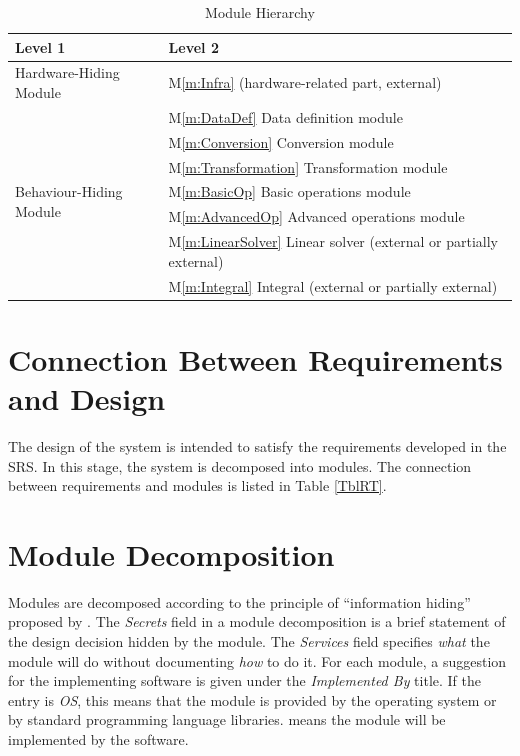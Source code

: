 \documentclass[12pt, titlepage]{article}
\newcommand{\mref}[1]{M\ref{m:#1}}
\begin{document}

\begin{table}[h!]
\centering
\begin{tabular}{p{} p{}}
\toprule
\textbf{Level 1} & \textbf{Level 2}\\
\midrule

{Hardware-Hiding Module} & \mref{Infra} (hardware-related part, external)\\
\midrule

\multirow{7}{0.3\textwidth}{Behaviour-Hiding Module} 
& \mref{DataDef} Data definition module\\
& \mref{Conversion} Conversion module\\
& \mref{Transformation} Transformation module\\
& \mref{BasicOp} Basic operations module\\
& \mref{AdvancedOp} Advanced operations module\\
\midrule

\multirow{3}{0.3\textwidth}{Software Decision Module} 
& \mref{LinearSolver} Linear solver (external or partially external)\\
& \mref{Integral} Integral (external or partially external)\\
\bottomrule

\end{tabular}
\caption{Module Hierarchy}
\label{TblMH}
\end{table}

\section{Connection Between Requirements and Design} \label{SecConnection}

The design of the system is intended to satisfy the requirements developed in
the SRS. In this stage, the system is decomposed into modules. The connection
between requirements and modules is listed in Table \ref{TblRT}.

\section{Module Decomposition} \label{SecMD}

Modules are decomposed according to the principle of ``information hiding''
proposed by \citet{ParnasEtAl1984}. The \emph{Secrets} field in a module
decomposition is a brief statement of the design decision hidden by the
module. The \emph{Services} field specifies \emph{what} the module will do
without documenting \emph{how} to do it. For each module, a suggestion for the
implementing software is given under the \emph{Implemented By} title. If the
entry is \emph{OS}, this means that the module is provided by the operating
system or by standard programming language libraries.  \emph{\progname{}} means the
module will be implemented by the \progname{} software.
\end{document}
